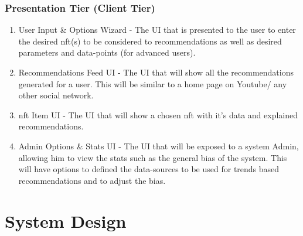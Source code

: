 \subsubsection{Presentation Tier (Client Tier)}
\begin{enumerate}
    \item User Input \& Options Wizard - The UI that is presented to the user to enter the desired \gls{nft}(s) to be considered to recommendations as well as desired parameters and data-points (for advanced users).
    \item Recommendations Feed UI - The UI that will show all the recommendations generated for a user. This will be similar to a home page on Youtube/ any other social network.
    \item \gls{nft} Item UI - The UI that will show a chosen \gls{nft} with it's data and explained recommendations.
    \item Admin Options \& Stats UI - The UI that will be exposed to a system Admin, allowing him to view the stats such as the general bias of the system. This will have options to defined the data-sources to be used for trends based recommendations and to adjust the bias.
\end{enumerate}





\section{System Design}
